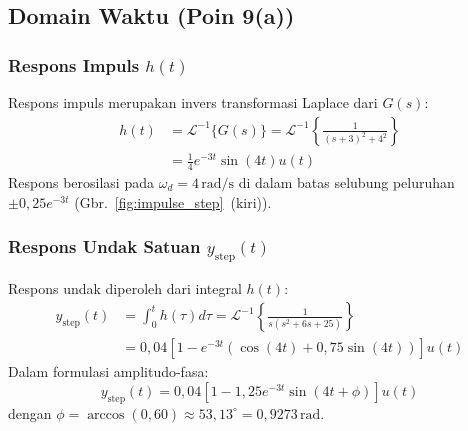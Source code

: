 \documentclass[journal]{IEEEtran}
\begin{document}
\subsection{Domain Waktu (Poin 9(a))} \label{sec:impulse}
\subsubsection{Respons Impuls $h(t)$}
Respons impuls merupakan invers transformasi Laplace dari $G(s)$:
\begin{align}
    h(t) &= \mathcal{L}^{-1}\{G(s)\} = \mathcal{L}^{-1}\left\{ \frac{1}{(s + 3)^2 + 4^2} \right\} \nonumber \\
    &= \frac{1}{4} e^{-3t} \sin(4t) u(t)
    \label{eq:h_t}
\end{align}
Respons berosilasi pada $\omega_d = 4\,\text{rad/s}$ di dalam batas selubung peluruhan $\pm 0{,}25 e^{-3t}$ (Gbr.~\ref{fig:impulse_step}~(kiri)).

\subsubsection{Respons Undak Satuan $y_{\text{step}}(t)$} \label{sec:step}
Respons undak diperoleh dari integral $h(t)$:
\begin{align}
    y_{\text{step}}(t) &= \int_0^t h(\tau) d\tau = \mathcal{L}^{-1}\left\{ \frac{1}{s(s^2 + 6s + 25)} \right\} \nonumber \\
    &= 0{,}04 \left[ 1 - e^{-3t} \left(\cos(4t) + 0{,}75\sin(4t)\right) \right] u(t)
    \label{eq:y_step_t}
\end{align}
Dalam formulasi amplitudo-fasa:
\begin{equation}
    y_{\text{step}}(t) = 0{,}04 \left[ 1 - 1{,}25 e^{-3t} \sin\left(4t + \phi\right) \right] u(t)
    \label{eq:y_step_amp_phase}
\end{equation}
dengan $\phi = \arccos(0{,}60) \approx 53{,}13^\circ = 0{,}9273\,\text{rad}$.
\end{document}
